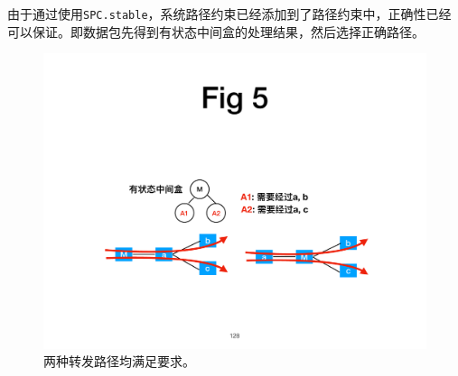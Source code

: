 \documentclass{ctexart}
\newcommand{\codeword}[1]{\texttt{\small{#1}}}
\begin{document}

由于通过使用\codeword{SPC.stable}，系统路径约束已经添加到了路径约束中，正确性已经可以保证。即数据包先得到有状态中间盒的处理结果，然后选择正确路径。


\begin{figure}[!htbp]
\centering
      \centering\includegraphics[width=\linewidth]{figures/ss-128.pdf}
\caption{两种转发路径均满足要求。}
\label{fig:c-example}
\end{figure}
\end{document}
